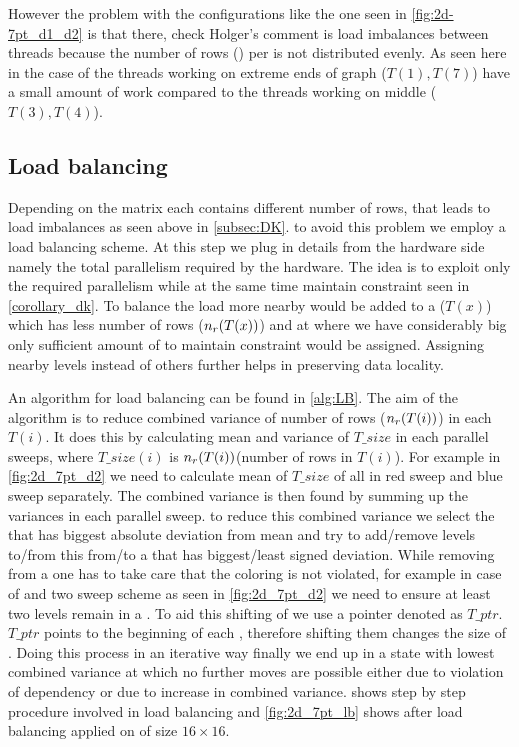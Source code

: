  However the problem with the configurations like the one seen in \cref{fig:2d-7pt_d1_d2} {\CA is that there, check Holger's comment} is load imbalances between threads because the number of rows (\nrows) per \levelGroup is not distributed evenly. As seen here in the case of \stex the threads working on extreme ends of graph (\eg $T(1), T(7)$) have a small amount of work compared to the threads working on middle (\eg $T(3), T(4)$). 
  
  \subsection{Load balancing}\label{subsec:LB}
  Depending on the matrix each \levelGroup contains different number of rows, that leads to load imbalances as {\CA seen above} in \cref{subsec:DK}. \Inorder to avoid this problem we employ a load balancing scheme. At this step  we plug in details from the hardware side  namely the total parallelism required by the hardware. The idea is to exploit only the required parallelism while at the same time maintain \DK constraint seen in \cref{corollary_dk}. To balance the load more nearby \levels would be added to a \levelGroup ($T(x)$) which has less number of rows ($n_{r}(T(x))$) and at \levelGroup where we have considerably big \levels only sufficient amount of \levels to maintain \DK constraint would be assigned. Assigning nearby levels instead of others further helps in preserving data locality. 
  
  An algorithm for load balancing can be found in \cref{alg:LB}. The aim of the algorithm is to reduce combined variance of number of rows ($n_{r}(T(i))$) in each \levelGroup $T(i)$. It does this by calculating mean and variance of $T\_size$ in each parallel sweeps, where $T\_size(i)$ is $n_{r}(T(i))$(number of rows in $T(i)$). For example in \cref{fig:2d_7pt_d2} we need to calculate mean of $T\_size$ of all \levelGroups in red sweep and blue sweep separately. The combined variance is then found by summing up the variances in each parallel sweep. \Inorder to reduce this combined variance we select the \levelGroup that has biggest absolute deviation from mean and try to add/remove levels to/from this \levelGroup from/to a \levelGroup that has biggest/least signed deviation. While removing \levels from a \levelGroup one has to take care that the \DK coloring is not violated, for example in case of \DTWO and two sweep scheme as seen in \cref{fig:2d_7pt_d2} we need to ensure at least two levels remain in a \levelGroup. To aid this shifting of \levels we use a pointer denoted as $T\_ptr$. $T\_ptr$ points to the beginning of each \levelGroup, therefore shifting them changes the size of \levelGroups. Doing this process in an iterative way finally we end up in a state with lowest combined variance at which no further moves are possible either due to violation of \DK dependency or due to increase in combined variance.  shows step by step procedure involved in load balancing and \cref{fig:2d_7pt_lb} shows \levelGroups after load balancing applied on \stex of size $16 \times 16.$

